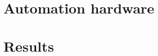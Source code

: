 \documentclass[utf8]{frontiersSCNS}
\begin{document}
\section{Automation hardware}

\section{Results}
\end{document}
